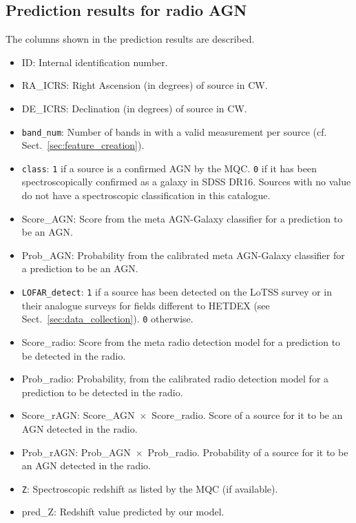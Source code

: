 \documentclass{aa}
\begin{document}
\begin{appendix}
\section{Prediction results for radio AGN}\label{sec:app_prediction_results}

The columns shown in the prediction results are described.

\begin{itemize}

\item ID: Internal identification number.
\item RA\_ICRS: Right Ascension (in degrees) of source in CW.
\item DE\_ICRS: Declination (in degrees) of source in CW.
\item \texttt{band\_num}: Number of bands in with a valid measurement per source (cf. Sect.~\ref{sec:feature_creation}).
\item \texttt{class}: \verb|1| if a source is a confirmed AGN by the MQC. \verb|0| if it has been spectroscopically confirmed as a galaxy in SDSS DR16. Sources with no value do not have a spectroscopic classification in this catalogue.
\item Score\_AGN: Score from the meta AGN-Galaxy classifier for a prediction to be an AGN.
\item Prob\_AGN: Probability from the calibrated meta AGN-Galaxy classifier for a prediction to be an AGN.
\item \texttt{LOFAR\_detect}: \verb|1| if a source has been detected on the LoTSS survey or in their analogue surveys for fields different to HETDEX (see Sect.~\ref{sec:data_collection}). \verb|0| otherwise.
\item Score\_radio: Score from the meta radio detection model for a prediction to be detected in the radio.
\item Prob\_radio: Probability, from the calibrated radio detection model for a prediction to be detected in the radio.
\item Score\_rAGN: Score\_AGN~$\times$~Score\_radio. Score of a source for it to be an AGN detected in the radio.
\item Prob\_rAGN: Prob\_AGN~$\times$~Prob\_radio. Probability of a source for it to be an AGN detected in the radio.
\item \texttt{Z}: Spectroscopic redshift as listed by the MQC (if available).
\item pred\_Z: Redshift value predicted by our model.


\end{itemize}
\end{appendix}
\end{document}
